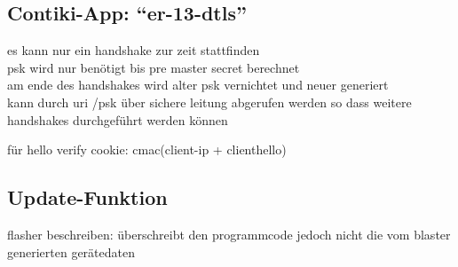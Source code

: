\subsection{Contiki-App: "`er-13-dtls"'}
es kann nur ein handshake zur zeit stattfinden\\
psk wird nur benötigt bis pre master secret berechnet\\
am ende des handshakes wird alter psk vernichtet und neuer generiert\\
kann durch uri /psk über sichere leitung abgerufen werden so dass weitere handshakes durchgeführt werden können

für hello verify cookie: cmac(client-ip + clienthello)

\subsection{Update-Funktion}
flasher beschreiben: überschreibt den programmcode jedoch nicht die vom blaster generierten gerätedaten